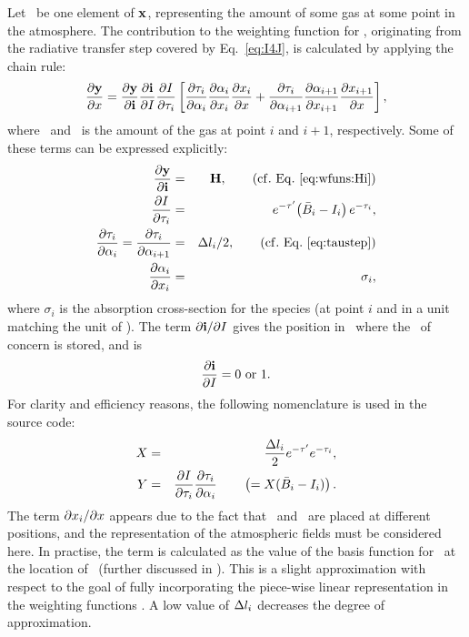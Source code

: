 Let \SttElm\ be one element of $\mathbf{x}$, representing the amount of
some gas at some point in the atmosphere. The contribution to the weighting
function for \SttElm, originating from the radiative transfer step covered by
Eq.~\ref{eq:I4J}, is calculated by applying the chain rule:
\begin{equation}
  \label{eq:chainrule}
  \frac{\partial\mathbf{y}}{\partial x} =  
  \frac{\partial\mathbf{y}}{\partial\mathbf{i}}
  \frac{\partial\mathbf{i}}{\partial I} \frac{\partial I}{\partial\tau_{i}}
  \left[ \frac{\partial\tau_{i}}{\partial{\alpha}_{i}}
         \frac{\partial{\alpha}_{i}}{\partial x_{i}} 
         \frac{\partial x_{i}}{\partial x} +
         \frac{\partial\tau_{i}}{\partial{\alpha}_{i+1}}
         \frac{\partial{\alpha}_{i+1}}{\partial x_{i+1}}
         \frac{\partial x_{i+1}}{\partial x} 
  \right],
\end{equation}
where \ and \ is the amount of the gas at point $i$ and
$i+1$, respectively. Some of these terms can be expressed explicitly:
\begin{eqnarray}
  \frac{\PartD \MsrVct}{\PartD\MpiVct} 
      &=& \SnsMtr, \qquad \mathrm{(cf.\ Eq.\ \ref{eq:wfuns:Hi})} \\
  \frac{\PartD\StoI}{\PartD\aOth{i}} 
      &=& e^{-\Oth'}\!\left(\bar{\Planck}_i-\aStoI{i}\right)e^{-\aOth{i}}, \\
  \frac{\PartD\aOth{i}}{\PartD\aAbsCoef{i}}=
  \frac{\PartD\aOth{i}}{\PartD\aAbsCoef{i+1}} 
      &=& \Delta\aPpathLng{i}/2, \qquad \mathrm{(cf.\ Eq.\ \ref{eq:taustep})}\\
  \frac{\PartD\aAbsCoef{i}}{\PartD\aSttElm{i}}
      &=& \sigma_i, 
\end{eqnarray}
where $\sigma_i$ is the absorption cross-section for the species (at point $i$
and in a unit matching the unit of \SttElm). The term $\partial\mathbf{i}
/ \partial I$ gives the position in \MpiVct\ where the \StoI\ of concern is
stored, and is
\begin{equation}
  \frac{\PartD\MpiVct}{\PartD\StoI} = 0\ \mathrm{or}\ 1.
\end{equation}
For clarity and efficiency reasons, the following nomenclature is used in the
source code:
\begin{eqnarray}
  X &=& \frac{\Delta l_{i}}{2} e^{-\tau'} e^{-\tau_{i}}, \\
  Y &=& \frac{\partial I}{\partial\tau_{i}}
        \frac{\partial\tau_{i}}{\partial{\alpha}_{i}}
    \qquad \left( = X(\bar{B}_i-I_{i}) \right).
\end{eqnarray}
The term $\partial x_{i}/\partial x$ appears due to the fact that
\ and \SttElm\ are placed at different positions, and the
representation of the atmospheric fields must be considered here. In practise,
the term is calculated as the value of the basis function for \SttElm\ at the
location of \ (further discussed in \citet{buehler:artst:05}). This
is a slight approximation with respect to the goal of fully incorporating the
piece-wise linear representation in the weighting functions
\citep{buehler:artst:05}. A low value of $\Delta l_{i}$ decreases the
degree of approximation.

